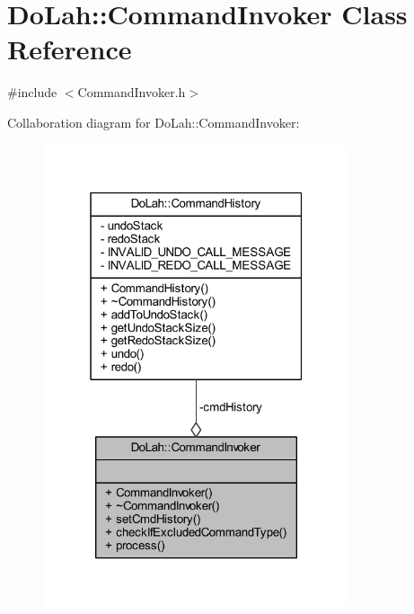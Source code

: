 \hypertarget{class_do_lah_1_1_command_invoker}{}\section{Do\+Lah\+:\+:Command\+Invoker Class Reference}
\label{class_do_lah_1_1_command_invoker}


{\ttfamily \#include $<$Command\+Invoker.\+h$>$}



Collaboration diagram for Do\+Lah\+:\+:Command\+Invoker\+:\nopagebreak
\begin{figure}[H]
\begin{center}
\leavevmode
\includegraphics[width=256pt]{class_do_lah_1_1_command_invoker__coll__graph}
\end{center}
\end{figure}
